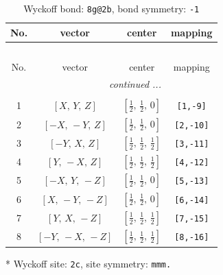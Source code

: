 \documentclass[fleqn,8pt]{jsarticle}
\begin{document}
\begin{longtable}{cccc}
\caption{Wyckoff bond: {\tt 8g@2b}, bond symmetry: {\tt -1}}
 \\
 \hline \hline
No. & vector & center & mapping \\ \hline \endfirsthead

\multicolumn{3}{l}{\tablename\ \thetable{}} \\
 \hline \hline
No. & vector & center & mapping \\ \hline \endhead

 \hline \hline
\multicolumn{3}{r}{\footnotesize\it continued ...} \\ \endfoot

 \hline \hline
\multicolumn{3}{r}{} \\ \endlastfoot

1 & $\left[ X,\, Y,\, Z \right]$ & $\left[ \frac{1}{2},\, \frac{1}{2},\, 0 \right]$ & {\tt [1,-9]} \\ \hline
2 & $\left[ - X,\, - Y,\, Z \right]$ & $\left[ \frac{1}{2},\, \frac{1}{2},\, 0 \right]$ & {\tt [2,-10]} \\ \hline
3 & $\left[ - Y,\, X,\, Z \right]$ & $\left[ \frac{1}{2},\, \frac{1}{2},\, \frac{1}{2} \right]$ & {\tt [3,-11]} \\ \hline
4 & $\left[ Y,\, - X,\, Z \right]$ & $\left[ \frac{1}{2},\, \frac{1}{2},\, \frac{1}{2} \right]$ & {\tt [4,-12]} \\ \hline
5 & $\left[ - X,\, Y,\, - Z \right]$ & $\left[ \frac{1}{2},\, \frac{1}{2},\, 0 \right]$ & {\tt [5,-13]} \\ \hline
6 & $\left[ X,\, - Y,\, - Z \right]$ & $\left[ \frac{1}{2},\, \frac{1}{2},\, 0 \right]$ & {\tt [6,-14]} \\ \hline
7 & $\left[ Y,\, X,\, - Z \right]$ & $\left[ \frac{1}{2},\, \frac{1}{2},\, \frac{1}{2} \right]$ & {\tt [7,-15]} \\ \hline
8 & $\left[ - Y,\, - X,\, - Z \right]$ & $\left[ \frac{1}{2},\, \frac{1}{2},\, \frac{1}{2} \right]$ & {\tt [8,-16]} \\
\end{longtable}
* Wyckoff site: {\tt 2c}, site symmetry: {\tt mmm.}
\renewcommand{\arraystretch}{1.2}
\end{document}

